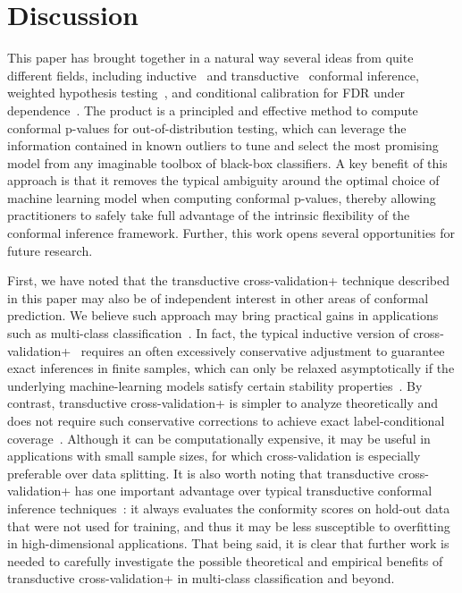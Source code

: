 \documentclass[11pt]{article}
\begin{document}
\section{Discussion}

This paper has brought together in a natural way several ideas from quite different fields, including inductive~\cite{vovk2005algorithmic} and transductive~\cite{vovk2013transductive} conformal inference, weighted hypothesis testing~\cite{genovese2006false,Caietal20}, and conditional calibration for FDR under dependence~\cite{2020conditionalcalibration}. 
The product is a principled and effective method to compute conformal p-values for out-of-distribution testing, which can leverage the information contained in known outliers to tune and select the most promising model from any imaginable toolbox of black-box classifiers.
A key benefit of this approach is that it removes the typical ambiguity around the optimal choice of machine learning model when computing conformal p-values, thereby allowing practitioners to safely take full advantage of the intrinsic flexibility of the conformal inference framework.
Further, this work opens several opportunities for future research.

First, we have noted that the transductive cross-validation+ technique described in this paper may also be of independent interest in other areas of conformal prediction. We believe such approach may bring practical gains in applications such as multi-class classification~\cite{romano2020classification}.
In fact, the typical inductive version of cross-validation+~\cite{barber2019predictive} requires an often excessively conservative adjustment to guarantee exact inferences in finite samples, which can only be relaxed asymptotically if the underlying machine-learning models satisfy certain stability properties~\cite{steinberger2018conditional}.
By contrast, transductive cross-validation+ is simpler to analyze theoretically and does not require such conservative corrections to achieve exact label-conditional coverage~\cite{vovk2003mondrian,romano2020classification}. Although it can be computationally expensive, it may be useful in applications with small sample sizes, for which cross-validation is especially preferable over data splitting. It is also worth noting that transductive cross-validation+ has one important advantage over typical transductive conformal inference techniques~\cite{vovk2005algorithmic,vovk2013transductive,lei2018distribution}: it always evaluates the conformity scores on hold-out data that were not used for training, and thus it may be less susceptible to overfitting in high-dimensional applications. That being said, it is clear that further work is needed to carefully investigate the possible theoretical and empirical benefits of transductive cross-validation+ in multi-class classification and beyond.
\end{document}
